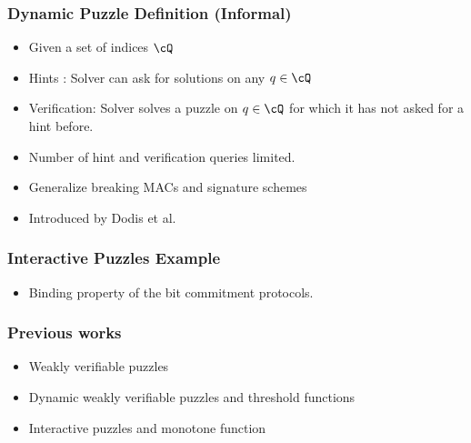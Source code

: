 \documentclass[first,firstsupp,handout,last]{ETHclass}
\begin{document}
\begin{frame}[t]
  \frametitle{Dynamic Puzzle Definition (Informal)}
  \begin{itemize}
    \item Given a set of indices $\cQ$
    \item Hints : Solver can ask for solutions on any $q \in \cQ$
    \item Verification: Solver solves a puzzle on $q \in \cQ$ for which it has not asked for a hint before.
    \item Number of hint and verification queries limited.
    \item Generalize breaking MACs and signature schemes
    \item Introduced by Dodis et al. \cite{dodis2009security}
  \end{itemize}
\end{frame}

\begin{frame}[t]
  \frametitle{Interactive Puzzles Example}
  \begin{itemize}
    \item Binding property of the bit commitment protocols.
  \end{itemize}
\end{frame}

\begin{frame}
  \frametitle{Previous works}
  \begin{itemize}
    \item Weakly verifiable puzzles \cite{canetti2005hardness}
    \item Dynamic weakly verifiable puzzles and threshold functions \cite{dodis2009security}
    \item Interactive puzzles and monotone function \cite{holenstein2011general}
  \end{itemize}

\end{frame}
\end{document}
